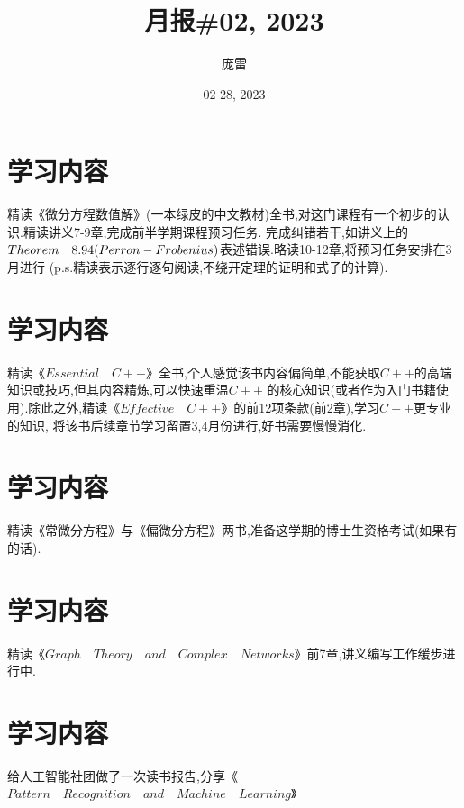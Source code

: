 \documentclass[
	12pt, %
]{fphw}
\title{月报\#02, 2023} %
\author{庞雷} %
\date{02 28, 2023} %
\institute{浙江大学 \\ 数学科学学院} %
\begin{document}
\maketitle %


\section*{学习内容\uppercase\expandafter{}}
精读《微分方程数值解》(一本绿皮的中文教材)全书,对这门课程有一个初步的认识.精读讲义7-9章,完成前半学期课程预习任务.
完成纠错若干,如讲义上的$Theorem\quad8.94\\(Perron-Frobenius)$表述错误.略读10-12章,将预习任务安排在3月进行
(p.s.精读表示逐行逐句阅读,不绕开定理的证明和式子的计算).


\section*{学习内容\uppercase\expandafter{}}
精读《$Essential\quad C++$》全书,个人感觉该书内容偏简单,不能获取$C++$的高端知识或技巧,但其内容精炼,可以快速重温$C++$
的核心知识(或者作为入门书籍使用).除此之外,精读《$Effective\quad C++$》的前12项条款(前2章),学习$C++$更专业的知识,
将该书后续章节学习留置3,4月份进行,好书需要慢慢消化.


\section*{学习内容\uppercase\expandafter{}}
精读《常微分方程》与《偏微分方程》两书,准备这学期的博士生资格考试(如果有的话).


\section*{学习内容\uppercase\expandafter{}}
精读《$Graph\quad Theory\quad and\quad Complex\quad Networks$》前7章,讲义编写工作缓步进行中.


\section*{学习内容\uppercase\expandafter{}}
给人工智能社团做了一次读书报告,分享《$Pattern\quad Recognition\quad and\quad Machine\quad Learning$》
\end{document}
